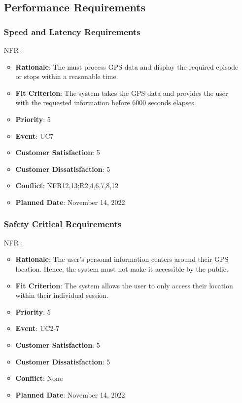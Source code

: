 \documentclass[12pt, titlepage]{article}
\newcounter{reqnum} %
\newcounter{freqnum} %
\begin{document}
\begin{itemize}
\subsection{Performance Requirements}

\subsubsection{Speed and Latency Requirements}
\item[NFR\refstepcounter{freqnum}\thefreqnum
\label{NFR}:] 
\begin{itemize}
    \item \textbf{Rationale}: The must process GPS data and display the required episode or stops within a reasonable time.
    \item \textbf{Fit Criterion}: The system takes the GPS data and provides the user with the requested information before 6000 seconds elapses.
    \item \textbf{Priority}: 5
    \item \textbf{Event}: UC7 %
    \item \textbf{Customer Satisfaction}: 5
    \item \textbf{Customer Dissatisfaction}: 5
    \item \textbf{Conflict}: NFR12,13;R2,4,6,7,8,12
    \item \textbf{Planned Date}: November 14, 2022
\end{itemize}
\subsubsection{Safety Critical Requirements}
\item[NFR\refstepcounter{freqnum}\thefreqnum
\label{NFR}:] 
\begin{itemize}
    \item \textbf{Rationale}: The user's personal information centers around their GPS location. Hence, the system must not make it accessible by the public.
    \item \textbf{Fit Criterion}: The system allows the user to only access their location within their individual session.
    \item \textbf{Priority}: 5
    \item \textbf{Event}: UC2-7%
    \item \textbf{Customer Satisfaction}: 5
    \item \textbf{Customer Dissatisfaction}: 5
    \item \textbf{Conflict}: None
    \item \textbf{Planned Date}: November 14, 2022
\end{itemize}

\end{itemize}
\end{document}
